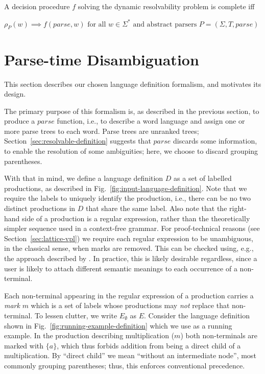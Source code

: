\documentclass[acmsmall,review,anonymous]{acmart}\settopmatter{printfolios=true,printccs=false,printacmref=false}
\newcommand{\T}{\Sigma} %
\newcommand{\parse}{\mathit{parse}} %
\begin{document}
\begin{definition}\label{def:dynamic-procedure-complete}
  A decision procedure $f$ solving the dynamic resolvability problem is complete iff

  $\rho_P(w) \implies f(\parse, w) \text{ for all } w \in \Sigma^{*} \text{ and abstract parsers } P = (\T, T, \parse)$
\end{definition}


\section{Parse-time Disambiguation} \label{sec:parse-time-disambiguation}

This section describes our chosen language definition formalism, and motivates its design.

The primary purpose of this formalism is, as described in the previous section, to produce a $\parse$ function, i.e., to describe a word language and assign one or more parse trees to each word. Parse trees are unranked trees; Section~\ref{sec:resolvable-definition} suggests that $\parse$ discards some information, to enable the resolution of some ambiguities; here, we choose to discard grouping parentheses.

With that in mind, we define a language definition $D$ as a set of labelled productions, as described in Fig.~\ref{fig:input-language-definition}. Note that we require the labels to uniquely identify the production, i.e., there can be no two distinct productions in $D$ that share the same label. Also note that the right-hand side of a production is a regular expression, rather than the theoretically simpler sequence used in a context-free grammar. For proof-technical reasons (see Section~\ref{sec:lattice-vpl}) we require each regular expression to be unambiguous, in the classical sense, when marks are removed. This can be checked using, e.g., the approach described by \citet{brabrandTypedUnambiguousPattern2010}. In practice, this is likely desirable regardless, since a user is likely to attach different semantic meanings to each occurrence of a non-terminal.

Each non-terminal appearing in the regular expression of a production carries a \emph{mark} $m$ which is a set of labels whose productions may \emph{not} replace that non-terminal. To lessen clutter, we write $E_\emptyset$ as $E$. Consider the language definition shown in Fig.~\ref{fig:running-example-definition} which we use as a running example. In the production describing multiplication ($m$) both non-terminals are marked with $\{a\}$, which thus forbids addition from being a direct child of a multiplication. By ``direct child'' we mean ``without an intermediate node'', most commonly grouping parentheses; thus, this enforces conventional precedence.
\end{document}
